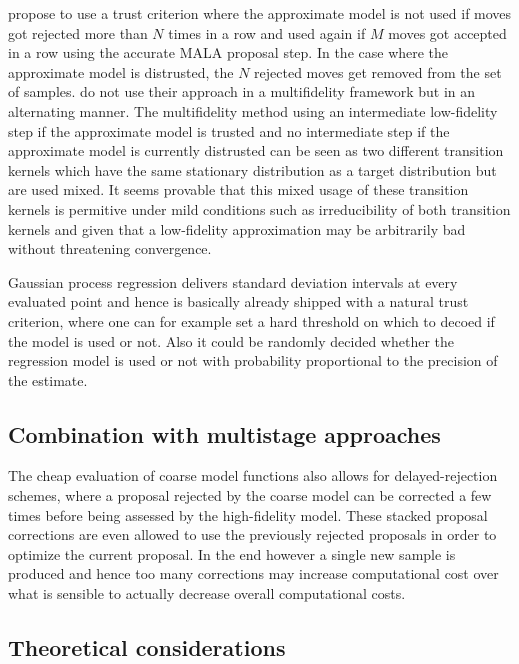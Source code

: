 \documentclass[10pt]{article}
\begin{document}
\cite{muller20} propose to use a trust criterion where the approximate model is not used if moves got rejected more
than $N$ times in a row and used again if $M$ moves got accepted in a row using the accurate MALA proposal step.
In the case where the approximate model is distrusted, the $N$ rejected moves get removed from the set of samples.
\cite{muller20}  do not use their approach in a multifidelity framework but in an alternating manner.
The multifidelity method using an intermediate low-fidelity step if the approximate model is trusted and no
intermediate step if the approximate model is currently distrusted can be seen as two different transition
kernels which have the same stationary distribution as a target distribution but are used mixed.
It seems provable that this mixed usage of these transition kernels is permitive under mild conditions such
as irreducibility of both transition kernels and given that a low-fidelity approximation may be arbitrarily bad
without threatening convergence.

Gaussian process regression delivers standard deviation intervals at every evaluated point and hence is 
basically already shipped with a natural trust criterion, where one can for example set a hard threshold on which to
decoed if the model is used or not.
Also it could be randomly decided whether the regression model is used or not with probability proportional to the 
precision of the estimate.

\subsection{Combination with multistage approaches}

The cheap evaluation of coarse model functions also allows for delayed-rejection schemes, where a proposal
rejected by the coarse model can be corrected a few times before being assessed by the high-fidelity model.
These stacked proposal corrections are even allowed to use the previously rejected proposals in order to 
optimize the current proposal. 
In the end however a single new sample is produced and hence too many corrections may increase computational
cost over what is sensible to actually decrease overall computational costs.

\subsection{Theoretical considerations}
\end{document}
